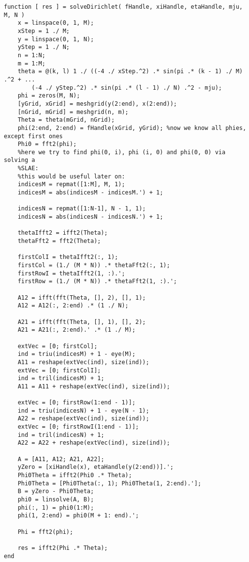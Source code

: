 \documentclass[11pt, oneside, final]{article}
\begin{document}
    \begin{verbatim}
function [ res ] = solveDirichlet( fHandle, xiHandle, etaHandle, mju, M, N )
    x = linspace(0, 1, M);
    xStep = 1 ./ M;
    y = linspace(0, 1, N);
    yStep = 1 ./ N;
    n = 1:N;
    m = 1:M;
    theta = @(k, l) 1 ./ ((-4 ./ xStep.^2) .* sin(pi .* (k - 1) ./ M) .^2 + ...
        (-4 ./ yStep.^2) .* sin(pi .* (l - 1) ./ N) .^2 - mju);
    phi = zeros(M, N);
    [yGrid, xGrid] = meshgrid(y(2:end), x(2:end));
    [nGrid, mGrid] = meshgrid(n, m);
    Theta = theta(mGrid, nGrid);
    phi(2:end, 2:end) = fHandle(xGrid, yGrid); %now we know all phies, except first ones
    Phi0 = fft2(phi);
    %here we try to find phi(0, i), phi (i, 0) and phi(0, 0) via solving a
    %SLAE:
    %this would be useful later on:
    indicesM = repmat([1:M], M, 1);
    indicesM = abs(indicesM - indicesM.') + 1;

    indicesN = repmat([1:N-1], N - 1, 1);
    indicesN = abs(indicesN - indicesN.') + 1;

    thetaIfft2 = ifft2(Theta);
    thetaFft2 = fft2(Theta);

    firstColI = thetaIfft2(:, 1);
    firstCol = (1./ (M * N)) .* thetaFft2(:, 1);
    firstRowI = thetaIfft2(1, :).';
    firstRow = (1./ (M * N)) .* thetaFft2(1, :).';

    A12 = ifft(fft(Theta, [], 2), [], 1);
    A12 = A12(:, 2:end) .* (1 ./ N);

    A21 = ifft(fft(Theta, [], 1), [], 2);
    A21 = A21(:, 2:end).' .* (1 ./ M);

    extVec = [0; firstCol];
    ind = triu(indicesM) + 1 - eye(M);
    A11 = reshape(extVec(ind), size(ind));
    extVec = [0; firstColI];
    ind = tril(indicesM) + 1;
    A11 = A11 + reshape(extVec(ind), size(ind));

    extVec = [0; firstRow(1:end - 1)];
    ind = triu(indicesN) + 1 - eye(N - 1);
    A22 = reshape(extVec(ind), size(ind));
    extVec = [0; firstRowI(1:end - 1)];
    ind = tril(indicesN) + 1;
    A22 = A22 + reshape(extVec(ind), size(ind));

    A = [A11, A12; A21, A22];
    yZero = [xiHandle(x), etaHandle(y(2:end))].';
    Phi0Theta = ifft2(Phi0 .* Theta);
    Phi0Theta = [Phi0Theta(:, 1); Phi0Theta(1, 2:end).'];
    B = yZero - Phi0Theta;
    phi0 = linsolve(A, B);
    phi(:, 1) = phi0(1:M);
    phi(1, 2:end) = phi0(M + 1: end).';

    Phi = fft2(phi);

    res = ifft2(Phi .* Theta);
end
        \end{verbatim}
    
\end{document}
